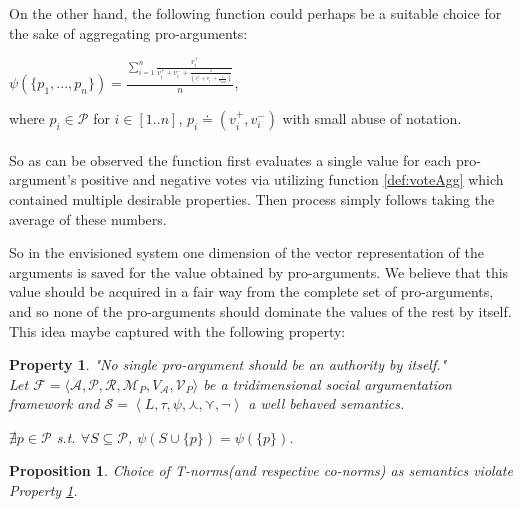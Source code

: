 \documentclass{article}
\newtheorem{property}{Property}
\newtheorem{proposition}{Proposition}
\newcommand{\args}{\mathcal{A}} %
\newcommand{\att}{\mathcal{R}}  %
\newcommand{\varg}{V_{\args}}   %
\begin{document}

On the other hand, the following function could perhaps be a suitable choice for the sake of aggregating pro-arguments:
\\
\begin{center}
$ \psi(\{p_1,...,p_n\})  =   \frac { \sum\limits_{i=1}^n \frac{v^{+}_i}{v^{+}_i+v^{-}_i+\frac{1}{(v^{+}_i+v^{-}_i+\frac{1}{v_{max}})}} } {n} $,\\
\end{center}

where $p_{i} \in \mathcal{P}$ for $i \in [1..n]$, $p_i \doteq (v^{+}_{i}, v^{-}_{i})$ with small abuse of notation.
\\ \\
So as can be observed the function first evaluates a single value for each pro-argument's positive and negative votes via utilizing function \ref{def:voteAgg} which contained multiple desirable properties. Then process simply follows taking the average of these numbers.

So in the envisioned system one dimension of the vector representation of the arguments is saved for the value obtained by pro-arguments. We believe that this value should be  acquired in a fair way from the complete set of pro-arguments, and so none of the pro-arguments should dominate the values of the rest by itself. This idea maybe captured with the following property:

\begin{property}
\label{proAut}
"No single pro-argument should be an authority by itself." \\
Let $\mathcal{F} = \langle \args, \mathcal{P}, \att, \mathcal{M}_P,  \varg, \mathcal{V}_P \rangle$ be a tridimensional social argumentation framework and $\mathcal{S}=\left\langle L,\tau,\psi, \curlywedge,\curlyvee,\lnot\right\rangle $ a well behaved semantics. %
\begin{center}
$\nexists p \in \mathcal{P}$ s.t. $\forall S \subseteq \mathcal{P}$, $\psi(S \cup \{p\} ) = \psi(\{p\})$.
\end{center}

\end{property}

\begin{proposition}
Choice of T-norms(and respective co-norms) as semantics violate Property \ref{proAut}.
\end{proposition}
\end{document}
